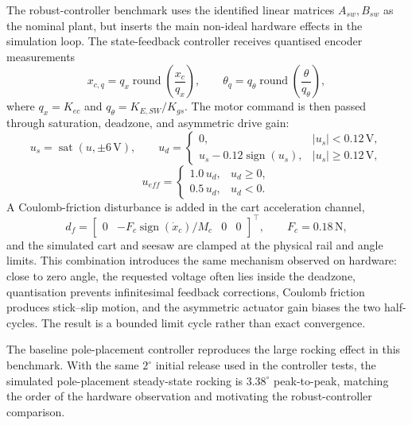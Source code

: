 \documentclass[11pt,a4paper]{article}
\begin{document}
The robust-controller benchmark uses the identified linear matrices $A_{sw},B_{sw}$ as the nominal plant, but inserts the main non-ideal hardware effects in the simulation loop. The state-feedback controller receives quantised encoder measurements
\begin{equation}
    x_{c,q} = q_x \operatorname{round}\!\left(\frac{x_c}{q_x}\right), \qquad
    \theta_q = q_\theta \operatorname{round}\!\left(\frac{\theta}{q_\theta}\right),
\end{equation}
where $q_x = K_{ec}$ and $q_\theta = K_{E,SW}/K_{gs}$. The motor command is then passed through saturation, deadzone, and asymmetric drive gain:
\begin{equation}
    u_s = \operatorname{sat}(u,\pm 6\,\mathrm{V}), \qquad
    u_d =
    \begin{cases}
        0, & |u_s| < 0.12\,\mathrm{V},\\
        u_s - 0.12\operatorname{sign}(u_s), & |u_s| \geq 0.12\,\mathrm{V},
    \end{cases}
\end{equation}
\begin{equation}
    u_{eff} =
    \begin{cases}
        1.0\,u_d, & u_d \geq 0,\\
        0.5\,u_d, & u_d < 0.
    \end{cases}
\end{equation}
A Coulomb-friction disturbance is added in the cart acceleration channel,
\begin{equation}
    d_f = \begin{bmatrix}0 & -F_c\operatorname{sign}(\dot{x}_c)/M_c & 0 & 0\end{bmatrix}^\top,
    \qquad F_c = 0.18\,\mathrm{N},
\end{equation}
and the simulated cart and seesaw are clamped at the physical rail and angle limits. This combination introduces the same mechanism observed on hardware: close to zero angle, the requested voltage often lies inside the deadzone, quantisation prevents infinitesimal feedback corrections, Coulomb friction produces stick--slip motion, and the asymmetric actuator gain biases the two half-cycles. The result is a bounded limit cycle rather than exact convergence.

The baseline pole-placement controller reproduces the large rocking effect in this benchmark. With the same $2^\circ$ initial release used in the controller tests, the simulated pole-placement steady-state rocking is $3.38^\circ$ peak-to-peak, matching the order of the hardware observation and motivating the robust-controller comparison.
\end{document}
